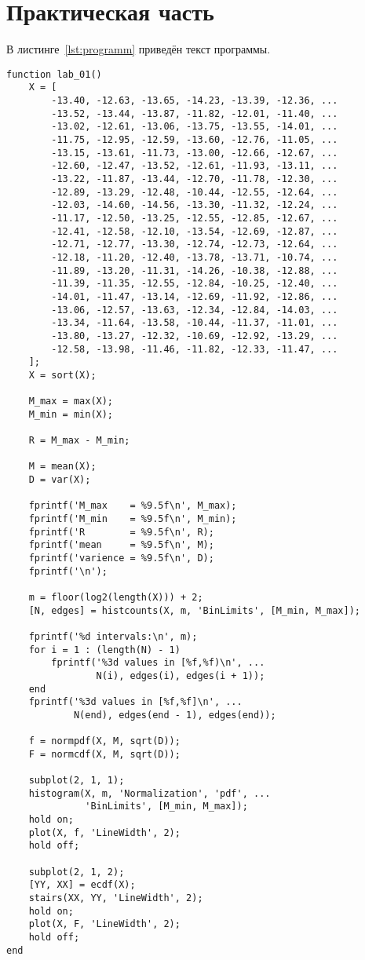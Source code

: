 \chapter{Практическая часть}

\lstset{language=matlab}

В листинге~\ref{lst:programm} приведён текст программы.
\begin{lstlisting}[caption={Текст программы},label={lst:programm}]
function lab_01()
    X = [
        -13.40, -12.63, -13.65, -14.23, -13.39, -12.36, ...
        -13.52, -13.44, -13.87, -11.82, -12.01, -11.40, ...
        -13.02, -12.61, -13.06, -13.75, -13.55, -14.01, ...
        -11.75, -12.95, -12.59, -13.60, -12.76, -11.05, ...
        -13.15, -13.61, -11.73, -13.00, -12.66, -12.67, ...
        -12.60, -12.47, -13.52, -12.61, -11.93, -13.11, ...
        -13.22, -11.87, -13.44, -12.70, -11.78, -12.30, ...
        -12.89, -13.29, -12.48, -10.44, -12.55, -12.64, ...
        -12.03, -14.60, -14.56, -13.30, -11.32, -12.24, ...
        -11.17, -12.50, -13.25, -12.55, -12.85, -12.67, ...
        -12.41, -12.58, -12.10, -13.54, -12.69, -12.87, ...
        -12.71, -12.77, -13.30, -12.74, -12.73, -12.64, ...
        -12.18, -11.20, -12.40, -13.78, -13.71, -10.74, ...
        -11.89, -13.20, -11.31, -14.26, -10.38, -12.88, ...
        -11.39, -11.35, -12.55, -12.84, -10.25, -12.40, ...
        -14.01, -11.47, -13.14, -12.69, -11.92, -12.86, ...
        -13.06, -12.57, -13.63, -12.34, -12.84, -14.03, ...
        -13.34, -11.64, -13.58, -10.44, -11.37, -11.01, ...
        -13.80, -13.27, -12.32, -10.69, -12.92, -13.29, ...
        -12.58, -13.98, -11.46, -11.82, -12.33, -11.47, ...
    ];
    X = sort(X);

    M_max = max(X);
    M_min = min(X);

    R = M_max - M_min;

    M = mean(X);
    D = var(X);

    fprintf('M_max    = %9.5f\n', M_max);
    fprintf('M_min    = %9.5f\n', M_min);
    fprintf('R        = %9.5f\n', R);
    fprintf('mean     = %9.5f\n', M);
    fprintf('varience = %9.5f\n', D);
    fprintf('\n');

    m = floor(log2(length(X))) + 2;
    [N, edges] = histcounts(X, m, 'BinLimits', [M_min, M_max]);

    fprintf('%d intervals:\n', m);
    for i = 1 : (length(N) - 1)
        fprintf('%3d values in [%f,%f)\n', ...
                N(i), edges(i), edges(i + 1));
    end
    fprintf('%3d values in [%f,%f]\n', ...
            N(end), edges(end - 1), edges(end));

    f = normpdf(X, M, sqrt(D));
    F = normcdf(X, M, sqrt(D));

    subplot(2, 1, 1);
    histogram(X, m, 'Normalization', 'pdf', ...
              'BinLimits', [M_min, M_max]);
    hold on;
    plot(X, f, 'LineWidth', 2);
    hold off;

    subplot(2, 1, 2);
    [YY, XX] = ecdf(X);
    stairs(XX, YY, 'LineWidth', 2);
    hold on;
    plot(X, F, 'LineWidth', 2);
    hold off;
end
\end{lstlisting}

